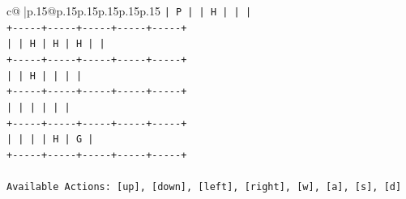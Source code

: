 \documentclass{article}
\begin{document}
{\begin{supertabular}{c@{$\;$}|p{.15\linewidth}@{}p{.15\linewidth}p{.15\linewidth}p{.15\linewidth}p{.15\linewidth}p{.15\linewidth}}
{{{\texttt{|  P  |     |  H  |     |     |} \\
\texttt{+{-}{-}{-}{-}{-}+{-}{-}{-}{-}{-}+{-}{-}{-}{-}{-}+{-}{-}{-}{-}{-}+{-}{-}{-}{-}{-}+} \\
\texttt{|     |  H  |  H  |  H  |     |} \\
\texttt{+{-}{-}{-}{-}{-}+{-}{-}{-}{-}{-}+{-}{-}{-}{-}{-}+{-}{-}{-}{-}{-}+{-}{-}{-}{-}{-}+} \\
\texttt{|     |  H  |     |     |     |} \\
\texttt{+{-}{-}{-}{-}{-}+{-}{-}{-}{-}{-}+{-}{-}{-}{-}{-}+{-}{-}{-}{-}{-}+{-}{-}{-}{-}{-}+} \\
\texttt{|     |     |     |     |     |} \\
\texttt{+{-}{-}{-}{-}{-}+{-}{-}{-}{-}{-}+{-}{-}{-}{-}{-}+{-}{-}{-}{-}{-}+{-}{-}{-}{-}{-}+} \\
\texttt{|     |     |     |  H  |  G  |} \\
\texttt{+{-}{-}{-}{-}{-}+{-}{-}{-}{-}{-}+{-}{-}{-}{-}{-}+{-}{-}{-}{-}{-}+{-}{-}{-}{-}{-}+} \\
\\ 
\texttt{Available Actions: {[}up{]}, {[}down{]}, {[}left{]}, {[}right{]}, {[}w{]}, {[}a{]}, {[}s{]}, {[}d{]}} \\
            }
        }
    }
     \\ \\


\end{supertabular}}
\end{document}
